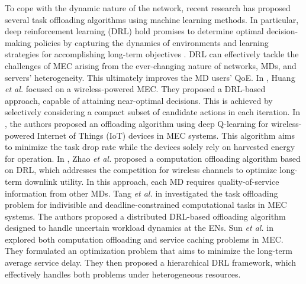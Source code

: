 \documentclass[12pt,draftclsnofoot,onecolumn]{IEEEtran}
\begin{document}
To cope with the dynamic nature of the network, recent research has proposed several task offloading algorithms using machine learning methods. In particular, deep reinforcement learning (DRL) hold promises to determine optimal decision-making policies by capturing the dynamics of environments and learning strategies for accomplishing long-term objectives \cite{arulkumaran2017deep}. DRL can effectively tackle the challenges of MEC arising from the ever-changing nature of networks, MDs, and servers' heterogeneity. This ultimately improves the MD users' QoE. In \cite{huang2019deep}, Huang \textit{et al.} focused on a wireless-powered MEC. They proposed a DRL-based  approach, capable of attaining near-optimal decisions. This is achieved by selectively considering a compact subset of candidate actions in each iteration. In \cite{Bolourian-WCL24}, the authors proposed an offloading algorithm using deep Q-learning for wireless-powered Internet of Things (IoT) devices in MEC systems. This algorithm aims to minimize the task drop rate while the devices solely rely on harvested energy for operation. In \cite{zhao2019deep}, Zhao \textit{et al.} proposed a computation offloading algorithm based on DRL, which addresses the competition for wireless channels to optimize long-term downlink utility. In this approach, each MD requires quality-of-service information from other MDs. Tang \textit{et al.} in \cite{9253665} investigated the task offloading problem for indivisible and deadline-constrained computational tasks in MEC systems. The authors proposed a distributed DRL-based offloading algorithm designed to handle uncertain workload dynamics at the ENs. Sun \textit{et al.} in \cite{sun2024hierarchical} explored both computation offloading and service caching problems in MEC. They formulated an optimization problem that aims to minimize the long-term average service delay. They then proposed a hierarchical DRL framework, which effectively handles both problems under heterogeneous resources. 
\end{document}
